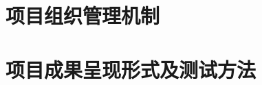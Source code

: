\documentclass{icsartcn}
\begin{document}
\section{项目组织管理机制}

\section{项目成果呈现形式及测试方法}



\appendix


\printindex{}
\end{document}
